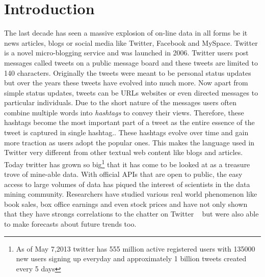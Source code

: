\chapter{Introduction}
The last decade has seen a massive explosion of on-line data in all forms be it news articles, blogs or social media like Twitter, Facebook and MySpace.
Twitter is a novel micro-blogging service and was launched in 2006.
Twitter users post messages called tweets on a public message board  and these tweets are limited to 140 characters.
Originally the tweets were meant to be personal status updates but over the years these tweets have evolved into much more.
Now apart from simple status updates, tweets can be URLs websites or even directed messages to particular individuals.
Due to the short nature of the messages users often combine multiple words into \emph{hashtags} to convey their views.
Therefore, these hashtags become the most important part of a tweet as the entire essence of the tweet is captured in single hashtag.. 
These hashtags evolve over time and gain more traction as users adopt the popular ones.
This makes the language used in Twitter very different from other textual web content like blogs and articles.
\newline
Today twitter has grown so big\footnote{As of May 7,2013 twitter has 555 million active registered users with 135000 new users signing up everyday and approximately 1 billion tweets created every 5 days}
that it has come to be looked at as a treasure trove of mine-able data.
With official APIs that are open to public, the easy access to large volumes of data has piqued the interest of scientists in the data mining community.
Researchers have studied various real world phenomenon like book sales, box office earnings and even stock prices and have not only shown that they have  strongs correlations to the chatter on Twitter ~\cite{gruhl2005predictive,asur2010predicting,bollen2011twitter}
but were also able to make forecasts about future trends too.
